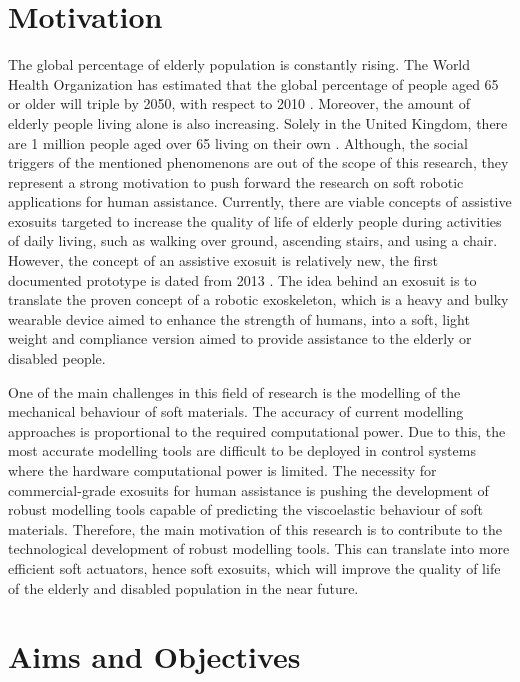 \section{Motivation}

The global percentage of elderly population is constantly rising. The World Health Organization has estimated that the global percentage of people aged 65 or older will triple by 2050, with respect to 2010 \cite{Colombo2012}. Moreover, the amount of elderly people living alone is also increasing. Solely in the United Kingdom, there are 1 million people aged over 65 living on their own \cite{Hill2019}. Although, the social triggers of the mentioned phenomenons are out of the scope of this research, they represent a strong motivation to push forward the research on soft robotic applications for human assistance. Currently, there are viable concepts of assistive exosuits targeted to increase the quality of life of elderly people during activities of daily living, such as walking over ground, ascending stairs, and using a chair. However, the concept of an assistive exosuit is relatively new, the first documented prototype is dated from 2013 \cite{wehner2013lightweight}. The idea behind an exosuit is to translate the proven concept of a robotic exoskeleton, which is a heavy and bulky wearable device aimed to enhance the strength of humans, into a soft, light weight and compliance version aimed to provide assistance to the elderly or disabled people. 

One of the main challenges in this field of research is the modelling of the mechanical behaviour of soft materials. The accuracy of current modelling approaches is proportional to the required computational power. Due to this, the most accurate modelling tools are difficult to be deployed in control systems where the hardware computational power is limited. The necessity for commercial-grade exosuits for human assistance is pushing the development of robust modelling tools capable of predicting the viscoelastic behaviour of soft materials. Therefore, the main motivation of this research is to contribute to the technological development of robust modelling tools. This can translate into more efficient soft actuators, hence soft exosuits, which will improve the quality of life of the elderly and disabled population in the near future.

\newpage

\section{Aims and Objectives}

